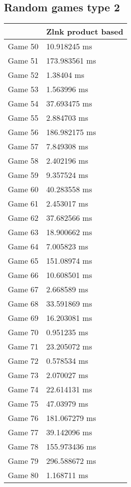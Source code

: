 \subsection{Random games type 2}
\begin{tabular}{|l|l|}
	\hline
	& Zlnk product based \\ \hline
	Game 50 & 10.918245 ms \\ \hline
	Game 51 & 173.983561 ms \\ \hline
	Game 52 & 1.38404 ms \\ \hline
	Game 53 & 1.563996 ms \\ \hline
	Game 54 & 37.693475 ms \\ \hline
	Game 55 & 2.884703 ms \\ \hline
	Game 56 & 186.982175 ms \\ \hline
	Game 57 & 7.849308 ms \\ \hline
	Game 58 & 2.402196 ms \\ \hline
	Game 59 & 9.357524 ms \\ \hline
	Game 60 & 40.283558 ms \\ \hline
	Game 61 & 2.453017 ms \\ \hline
	Game 62 & 37.682566 ms \\ \hline
	Game 63 & 18.900662 ms \\ \hline
	Game 64 & 7.005823 ms \\ \hline
	Game 65 & 151.08974 ms \\ \hline
	Game 66 & 10.608501 ms \\ \hline
	Game 67 & 2.668589 ms \\ \hline
	Game 68 & 33.591869 ms \\ \hline
	Game 69 & 16.203081 ms \\ \hline
	Game 70 & 0.951235 ms \\ \hline
	Game 71 & 23.205072 ms \\ \hline
	Game 72 & 0.578534 ms \\ \hline
	Game 73 & 2.070027 ms \\ \hline
	Game 74 & 22.614131 ms \\ \hline
	Game 75 & 47.03979 ms \\ \hline
	Game 76 & 181.067279 ms \\ \hline
	Game 77 & 39.142096 ms \\ \hline
	Game 78 & 155.973436 ms \\ \hline
	Game 79 & 296.588672 ms \\ \hline
	Game 80 & 1.168711 ms \\ \hline

\end{tabular}
